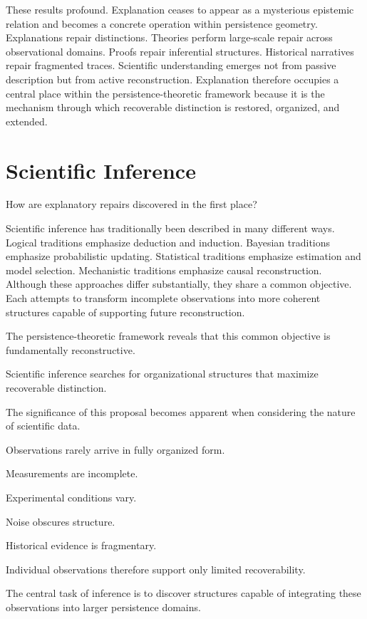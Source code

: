 \documentclass[12pt,oneside]{article}
\theoremstyle{definition}
\begin{document}
These results profound. Explanation ceases to appear as a mysterious epistemic relation and becomes a concrete operation within persistence geometry. Explanations repair distinctions. Theories perform large-scale repair across observational domains. Proofs repair inferential structures. Historical narratives repair fragmented traces. Scientific understanding emerges not from passive description but from active reconstruction. Explanation therefore occupies a central place within the persistence-theoretic framework because it is the mechanism through which recoverable distinction is restored, organized, and extended.

\section{Scientific Inference}

How are explanatory repairs discovered in the first place?

Scientific inference has traditionally been described in many different ways. Logical traditions emphasize deduction and induction. Bayesian traditions emphasize probabilistic updating. Statistical traditions emphasize estimation and model selection. Mechanistic traditions emphasize causal reconstruction. Although these approaches differ substantially, they share a common objective. Each attempts to transform incomplete observations into more coherent structures capable of supporting future reconstruction.

The persistence-theoretic framework reveals that this common objective is fundamentally reconstructive.

Scientific inference searches for organizational structures that maximize recoverable distinction.

The significance of this proposal becomes apparent when considering the nature of scientific data.

Observations rarely arrive in fully organized form.

Measurements are incomplete.

Experimental conditions vary.

Noise obscures structure.

Historical evidence is fragmentary.

Individual observations therefore support only limited recoverability.

The central task of inference is to discover structures capable of integrating these observations into larger persistence domains.
\end{document}
